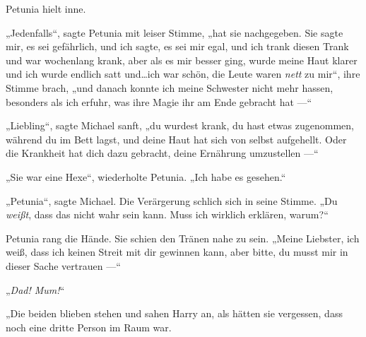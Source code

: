 Petunia hielt inne.

„Jedenfalls“, sagte Petunia mit leiser Stimme, „hat sie nachgegeben. Sie sagte mir, es sei gefährlich, und ich sagte, es sei mir egal, und ich trank diesen Trank und war wochenlang krank, aber als es mir besser ging, wurde meine Haut klarer und ich wurde endlich satt und…ich war schön, die Leute waren \emph{nett} zu mir“, ihre Stimme brach, „und danach konnte ich meine Schwester nicht mehr hassen, besonders als ich erfuhr, was ihre Magie ihr am Ende gebracht hat —“

„Liebling“, sagte Michael sanft, „du wurdest krank, du hast etwas zugenommen, während du im Bett lagst, und deine Haut hat sich von selbst aufgehellt. Oder die Krankheit hat dich dazu gebracht, deine Ernährung umzustellen —“

„Sie war eine Hexe“, wiederholte Petunia. „Ich habe es gesehen.“

„Petunia“, sagte Michael. Die Verärgerung schlich sich in seine Stimme. „Du \emph{weißt}, dass das nicht wahr sein kann. Muss ich wirklich erklären, warum?“

Petunia rang die Hände. Sie schien den Tränen nahe zu sein. „Meine Liebster, ich weiß, dass ich keinen Streit mit dir gewinnen kann, aber bitte, du musst mir in dieser Sache vertrauen —“

„\emph{Dad! Mum!}“

„Die beiden blieben stehen und sahen Harry an, als hätten sie vergessen, dass noch eine dritte Person im Raum war.


